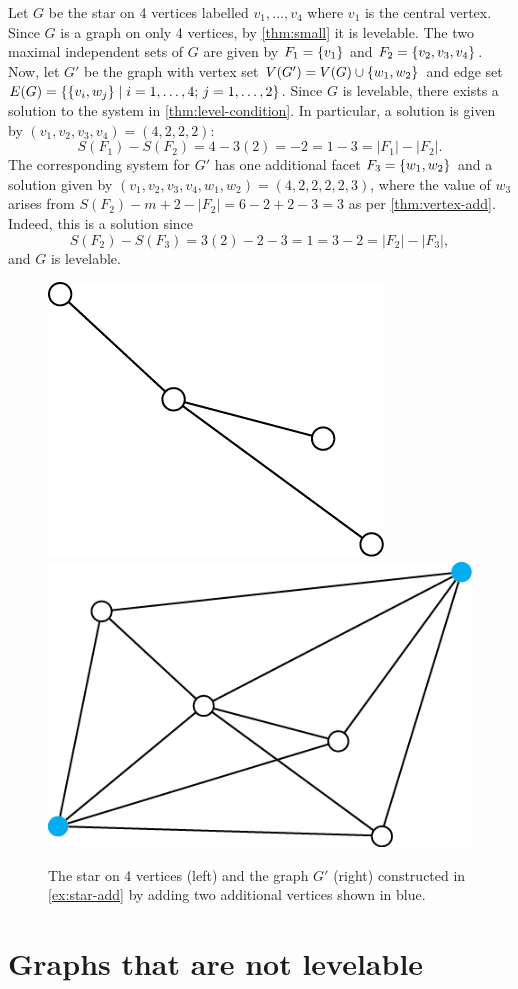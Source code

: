 \begin{example} \label{ex:star-add}
Let $G$ be the star on 4 vertices labelled $v_1, \dots, v_4$ where $v_1$ is the central vertex. Since $G$ is a graph on only 4 vertices, by \autoref{thm:small} it is levelable. The two maximal independent sets of $G$ are given by 
$F_1 = \{ v_1 \}$ and 
$F_2 = \{ v_2, v_3, v_4 \}$.
Now, let $G'$ be the graph with vertex set $V(G') = V(G) \cup \{ w_1, w_2 \}$ and edge set $E(G) = \{  \{ v_i, w_j \} \; | \; i = 1, \dots, 4; \, j = 1, \dots, 2 \}$. Since $G$ is levelable, there exists a solution to the system in \autoref{thm:level-condition}. In particular, a solution is given by $(v_1, v_2, v_3, v_4) = (4, 2, 2, 2)$:
$$
S(F_1) - S(F_2) = 4 - 3(2) = -2 = 1 - 3 = |F_1| - |F_2|.
$$
The corresponding system for $G'$ has one additional facet $F_3 = \{ w_1, w_2 \}$ and a solution given by $(v_1, v_2, v_3, v_4, w_1, w_2) = (4, 2, 2, 2, 2, 3)$, where the value of $w_3$ arises from $S(F_2) - m + 2 - |F_2| = 6 - 2 + 2 - 3 = 3$ as per \autoref{thm:vertex-add}. Indeed, this is a solution since
$$
S(F_2) - S(F_3) = 3(2) - 2 - 3 = 1 = 3 - 2 = |F_2| - |F_3|,
$$
and $G$ is levelable.

\begin{figure}[h]
    \myfloatalign
    \subfloat
    {\includegraphics[width=.26\linewidth]{figures/4-star-before.png}} \qquad
    \subfloat
    {\includegraphics[width=.37\linewidth]{figures/4-star-addition.png}}
    \caption{The star on 4 vertices (left) and the graph $G'$ (right) constructed in \autoref{ex:star-add} by adding two additional vertices shown in blue.}
\end{figure}

\end{example}


\chapter{Graphs that are not levelable}

